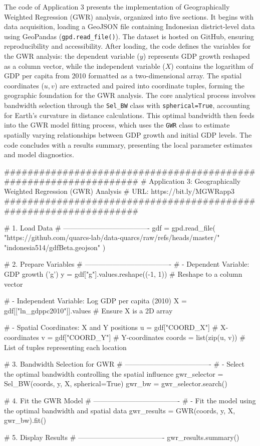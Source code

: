 \documentclass[smallextended, natbib]{svjour3}       %
\begin{document}
The code of Application 3 presents the implementation of Geographically Weighted Regression (GWR) analysis, organized into five sections.
It begins with data acquisition, loading a GeoJSON file containing Indonesian district-level data using GeoPandas (\texttt{gpd.read\_file()}). 
The dataset is hosted on GitHub, ensuring reproducibility and accessibility. 
After loading, the code defines the variables for the GWR analysis: the dependent variable ($y$) represents GDP growth reshaped as a column vector, while the independent variable ($X$) contains the logarithm of GDP per capita from 2010 formatted as a two-dimensional array.
The spatial coordinates ($u, v$) are extracted and paired into coordinate tuples, forming the geographic foundation for the GWR analysis. 
The core analytical process involves bandwidth selection through the \texttt{Sel\_BW} class with \texttt{spherical=True}, accounting for Earth's curvature in distance calculations. 
This optimal bandwidth then feeds into the GWR model fitting process, which uses the \texttt{GWR} class to estimate spatially varying relationships between GDP growth and initial GDP levels. 
The code concludes with a results summary, presenting the local parameter estimates and model diagnostics.


\begin{python}
##################################################################
# Application 3: Geographically Weighted Regression (GWR) Analysis
# URL: https://bit.ly/MGWRapp3
##################################################################

# 1. Load Data
# -------------------------------------
gdf = gpd.read_file(
    "https://github.com/quarcs-lab/data-quarcs/raw/refs/heads/master/"
    "indonesia514/gdfBeta.geojson"
)

# 2. Prepare Variables
# -------------------------------------
# - Dependent Variable: GDP growth ('g')
y = gdf["g"].values.reshape((-1, 1))  # Reshape to a column vector

# - Independent Variable: Log GDP per capita (2010)
X = gdf[["ln_gdppc2010"]].values  # Ensure X is a 2D array

# - Spatial Coordinates: X and Y positions
u = gdf["COORD_X"]  # X-coordinates
v = gdf["COORD_Y"]  # Y-coordinates
coords = list(zip(u, v))  # List of tuples representing each location

# 3. Bandwidth Selection for GWR
# -------------------------------------
# - Select the optimal bandwidth controlling the spatial influence
gwr_selector = Sel_BW(coords, y, X, spherical=True)
gwr_bw = gwr_selector.search()

# 4. Fit the GWR Model
# -------------------------------------
# - Fit the model using the optimal bandwidth and spatial data
gwr_results = GWR(coords, y, X, gwr_bw).fit()

# 5. Display Results
# -------------------------------------
gwr_results.summary()
\end{python}
\end{document}
